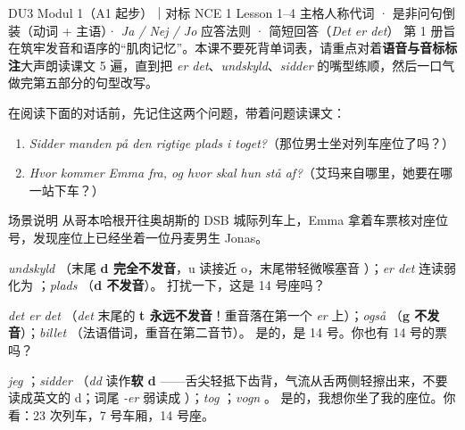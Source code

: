 {DU3 Modul 1（A1 起步）｜对标 NCE 1 Lesson 1--4}
{主格人称代词 · 是非问句倒装（动词 + 主语）· \textit{Ja / Nej / Jo} 应答法则 · 简短回答（\textit{Det er det}）}
{第 1 册旨在筑牢发音和语序的“肌肉记忆”。本课不要死背单词表，请重点对着\textbf{语音与音标标注}大声朗读课文 5 遍，直到把 \textit{er det}、\textit{undskyld}、\textit{sidder} 的嘴型练顺，然后一口气做完第五部分的句型改写。}

\begin{foerduleaeser}
在阅读下面的对话前，先记住这两个问题，带着问题读课文：
\begin{enumerate}
  \item \textit{Sidder manden på den rigtige plads i toget?}（那位男士坐对列车座位了吗？）
  \item \textit{Hvor kommer Emma fra, og hvor skal hun stå af?}（艾玛来自哪里，她要在哪一站下车？）
\end{enumerate}
\end{foerduleaeser}


\begin{tipbox}{场景说明}
从哥本哈根开往奥胡斯的 DSB 城际列车上，Emma 拿着车票核对座位号，发现座位上已经坐着一位丹麦男生 Jonas。
\end{tipbox}

{\textit{undskyld} （末尾 \textbf{d 完全不发音}，u 读接近 o，末尾带轻微喉塞音 ）；\textit{er det} 连读弱化为 ；\textit{plads} （\textbf{d 不发音}）。}
{打扰一下，这是 14 号座吗？}

{\textit{det er det} （\textit{det} 末尾的 \textbf{t 永远不发音}！重音落在第一个 \textit{er} 上）；\textit{også} （\textbf{g 不发音}）；\textit{billet} （法语借词，重音在第二音节）。}
{是的，是 14 号。你也有 14 号的票吗？}

{\textit{jeg} ；\textit{sidder} （\textit{dd} 读作\textbf{软 d }——舌尖轻抵下齿背，气流从舌两侧轻擦出来，不要读成英文的 d；词尾 \textit{-er} 弱读成 ）；\textit{tog} ；\textit{vogn} 。}
{是的，我想你坐了我的座位。你看：23 次列车，7 号车厢，14 号座。}

